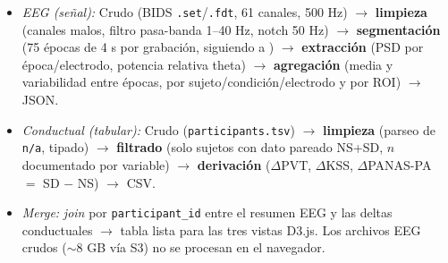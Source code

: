 \documentclass[10pt]{article}
\begin{document}
{\begin{itemize}
    \begin{itemize}
        \item[--] \emph{EEG (señal):} Crudo (BIDS \texttt{.set}/\texttt{.fdt}, 61 canales, 500 Hz) $\rightarrow$ \textbf{limpieza} (canales malos, filtro pasa-banda 1--40 Hz, notch 50 Hz) $\rightarrow$ \textbf{segmentación} (75 épocas de 4 s por grabación, siguiendo a \citealt{cui2026}) $\rightarrow$ \textbf{extracción} (PSD por época/electrodo, potencia relativa theta) $\rightarrow$ \textbf{agregación} (media y variabilidad entre épocas, por sujeto/condición/electrodo y por ROI) $\rightarrow$ JSON.
        \item[--] \emph{Conductual (tabular):} Crudo (\texttt{participants.tsv}) $\rightarrow$ \textbf{limpieza} (parseo de \texttt{n/a}, tipado) $\rightarrow$ \textbf{filtrado} (solo sujetos con dato pareado NS+SD, $n$ documentado por variable) $\rightarrow$ \textbf{derivación} ($\Delta$PVT, $\Delta$KSS, $\Delta$PANAS-PA $=$ SD $-$ NS) $\rightarrow$ CSV.
        \item[--] \emph{Merge:} \emph{join} por \texttt{participant\_id} entre el resumen EEG y las deltas conductuales $\rightarrow$ tabla lista para las tres vistas D3.js. Los archivos EEG crudos ($\sim$8 GB vía S3) no se procesan en el navegador.
    \end{itemize}
\end{itemize}
}
\end{document}
